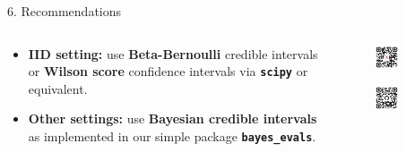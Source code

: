 \documentclass[final]{beamer}
\newlength{\colwidth}
\begin{document}
\begin{frame}[fragile]
\begin{columns}[t]
\begin{column}{\colwidth}
\begin{alertblock}{6. Recommendations}
    \begin{columns}
      \begin{column}{0.7\textwidth}

        \begin{itemize}
          \item \textbf{IID setting:} use \textbf{Beta-Bernoulli} credible intervals or \textbf{Wilson score} confidence intervals via \textbf{\texttt{scipy}} or equivalent.
          
          \item \textbf{Other settings:} use \textbf{Bayesian credible intervals} as implemented in our simple package \textbf{\texttt{bayes\_evals}}.
        \end{itemize}
      \end{column}
      \begin{column}{0.3\textwidth}
        \vspace{1em}
        \begin{figure}
          \centering
          \includegraphics[width=0.5\textwidth]{fig/arxiv_qr.png}
        \end{figure}

        \vspace{0.5em}
      
        \begin{figure}
          \centering
          \includegraphics[width=0.5\textwidth]{fig/github_qr.png}
        \end{figure}
      \end{column}
    \end{columns}


\end{alertblock}
\end{column}
\end{columns}
\end{frame}
\end{document}
